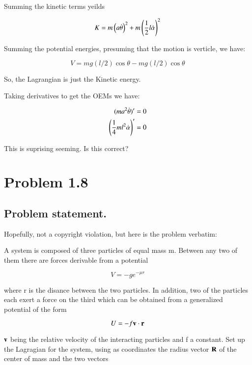\documentclass{article}
\newcommand{\dotalpha}[0]{\dot{\alpha}}
\newcommand{\dottheta}[0]{\dot{\theta}}
\begin{document}
Summing the kinetic terms yeilds

\begin{equation*}
K = m \left(a \dottheta \right)^2 + m \left(\inv{2} l \dotalpha\right)^2
\end{equation*}

Summing the potential energies, presuming that the motion is verticle, we have:

\begin{equation*}
V = m g (l/2) \cos\theta - m g (l/2) \cos \theta
\end{equation*}

So, the Lagrangian is just the Kinetic energy.

Taking derivatives to get the OEMs we have:

\begin{align*}
(m a^2 \dottheta)' &= 0 \\
\left(\inv{4} m l^2 \dotalpha \right)' &= 0
\end{align*}

This is suprising seeming.  Is this correct?

\section{ Problem 1.8 }

\subsection{ Problem statement. }

Hopefully, not a copyright violation, but here is the problem verbatim:

A system is composed of three particles of equal mass m.  Between any two of them there are forces derivable from a potential

\begin{equation*}
V = -g e^{-\mu r}
\end{equation*}

where r is the disance between the two particles.  In addition, two of the particles each exert a force on the third which can be obtained from a generalized potential of the form

\begin{equation*}
U = -f \mathbf{v} \cdot \mathbf{r}
\end{equation*}

$\mathbf{v}$ being the relative velocity of the interacting particles and f a constant.  Set up the Lagragian for the system, using as coordinates the radius vector $\mathbf{R}$ of the center of mass and the two vectors
\end{document}
